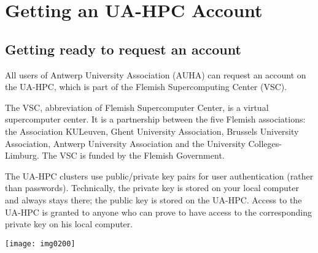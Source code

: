 \chapter{Getting an UA-HPC Account}
\label{ch:getting-a-hpc-account}

\section{Getting ready to request an account}

All users of Antwerp University Association (AUHA) can request an account on the UA-HPC, which is part of the Flemish Supercomputing Center (VSC).

The VSC, abbreviation of Flemish Supercomputer Center, is a virtual supercomputer center. It is a partnership between the five Flemish associations: the Association KULeuven,  Ghent University Association, Brussels University Association, Antwerp University Association and the University Colleges-Limburg. The VSC is funded by the Flemish Government.

The UA-HPC clusters use public/private key pairs for user authentication (rather than passwords). Technically, the private key is stored on your local computer and always stays there; the public key is stored on the UA-HPC.  Access to the UA-HPC is granted to anyone who can prove to have access to the corresponding private key on his local computer.

\texttt{[image: img0200]}

